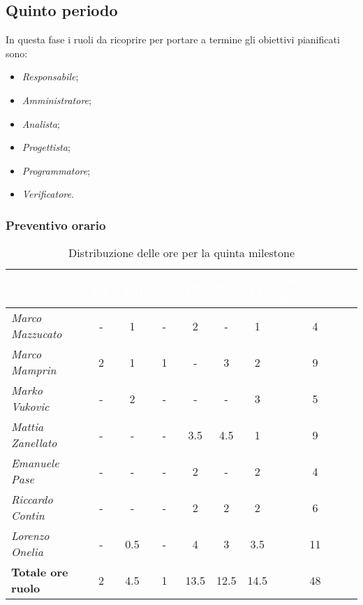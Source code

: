 \subsection{Quinto periodo}

In questa fase i ruoli da ricoprire per portare a termine gli obiettivi pianificati sono:
\begin{itemize}
    \item \textit{Responsabile};
    \item \textit{Amministratore};
    \item \textit{Analista};
    \item \textit{Progettista};
    \item \textit{Programmatore};
    \item \textit{Verificatore}.
\end{itemize}

\subsubsection{Preventivo orario}

\begin{table}[H]
    \renewcommand\arraystretch{1.5}
    \centering
    \begin{tabular}{|l|c|c|c|c|c|c|c|}
    \hline
    \rowcolor[HTML]{036400}
    \textcolor{white}{\textbf{Membro}} & \multicolumn{1}{l|}{\textcolor{white}{\textbf{RE}}} & \multicolumn{1}{l|}{\textcolor{white}{\textbf{AM}}} & \multicolumn{1}{l|}{\textcolor{white}{\textbf{AN}}} & \multicolumn{1}{l|}{\textcolor{white}{\textbf{PT}}} & \multicolumn{1}{l|}{\textcolor{white}{\textbf{PR}}} & \multicolumn{1}{l|}{\textcolor{white}{\textbf{VE}}} & \multicolumn{1}{l|}{\textcolor{white}{\textbf{Totale ore persona}}} \\ \hline
    \rowcolor[HTML]{EFEFEF}\textit{Marco Mazzucato}  & - & 1   & -     & 2    & -    & 1    & 4     \\ \hline
    \rowcolor[HTML]{C0C0C0}\textit{Marco Mamprin}    & 2 & 1   & 1     & -    & 3    & 2    & 9     \\ \hline
    \rowcolor[HTML]{EFEFEF}\textit{Marko Vukovic}    & - & 2   & -     & -    & -    & 3    & 5     \\ \hline
    \rowcolor[HTML]{C0C0C0}\textit{Mattia Zanellato} & - & -   & -     & 3.5  & 4.5  & 1    & 9     \\ \hline
    \rowcolor[HTML]{EFEFEF}\textit{Emanuele Pase}    & - & -   & -     & 2    & -    & 2    & 4     \\ \hline
    \rowcolor[HTML]{C0C0C0}\textit{Riccardo Contin}  & - & -   & -     & 2    & 2    & 2    & 6     \\ \hline
    \rowcolor[HTML]{EFEFEF}\textit{Lorenzo Onelia}   & - & 0.5 & -     & 4    & 3    & 3.5  & 11    \\ \hline
    \rowcolor[HTML]{C0C0C0}\textbf{Totale ore ruolo} & 2 & 4.5 & 1     & 13.5 & 12.5 & 14.5 & 48    \\ \hline
    \end{tabular}
    \caption{Distribuzione delle ore per la quinta milestone}
\end{table}

